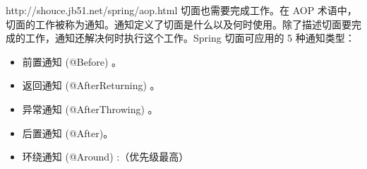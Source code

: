 \documentclass[../../../interview-questions.tex]{subfiles}
\begin{document}
http://shouce.jb51.net/spring/aop.html
切面也需要完成工作。在 AOP 术语中，切面的工作被称为通知。通知定义了切面是什么以及何时使用。除了描述切面要完成的工作，通知还解决何时执行这个工作。Spring 切面可应用的 5 种通知类型：

\begin{itemize}
    \item {前置通知 (@Before) 。}
    \item {返回通知 (@AfterReturning) 。}
    \item {异常通知 (@AfterThrowing) 。}
    \item {后置通知 (@After)。}
    \item {环绕通知 (@Around) :（优先级最高）}
\end{itemize}
\end{document}
